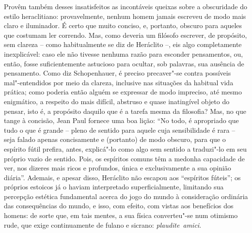 Provêm também desses insatisfeitos as incontáveis queixas sobre a
obscuridade do estilo heraclitiano: provavelmente, nenhum homem jamais
escreveu de modo mais claro e iluminador. É certo que muito conciso, e,
portanto, obscuro para aqueles que costumam ler correndo. Mas,
como deveria um filósofo escrever, de propósito, sem clareza -- como
habitualmente se diz de Heráclito --, eis algo completamente
inexplicável: caso ele não tivesse nenhuma razão para esconder
pensamentos, ou, então, fosse suficientemente astucioso para ocultar,
sob palavras, sua ausência de pensamento. Como diz Schopenhauer, é
preciso precaver"-se contra possíveis mal"-entendidos por meio da
clareza, inclusive nas situações da habitual vida prática; como poderia
então alguém se expressar de modo impreciso, até mesmo enigmático, a
respeito do mais difícil, abstruso e quase inatingível objeto do
pensar, isto é, a propósito daquilo que é a tarefa mesma da filosofia?
Mas, no que tange à concisão, Jean Paul fornece uma boa lição:
``No todo, é apropriado que tudo o que é grande -- pleno de
sentido para aquele cuja sensibilidade é rara -- seja falado apenas
concisamente e (portanto) de modo obscuro, para que o espírito fútil
prefira, antes, explicá"-lo como algo sem sentido a traduzi"-lo em seu
próprio vazio de sentido. Pois, os espíritos comuns têm a medonha
capacidade de ver, nos dizeres mais ricos e profundos, única e
exclusivamente a sua opinião diária''. Ademais, e apesar
disso, Heráclito não escapou aos ``espíritos
fúteis''; os próprios estoicos já o haviam interpretado
superficialmente, limitando sua percepção estética fundamental acerca
do jogo do mundo à consideração ordinária das consequências do mundo, e isso, com
efeito, com vistas aos benefícios dos homens: de sorte que, em
tais mentes, a sua física converteu"-se num otimismo rude, que exige
continuamente de fulano e sicrano: \mbox{\textit{plaudite amici}.} 

\sectionitem

